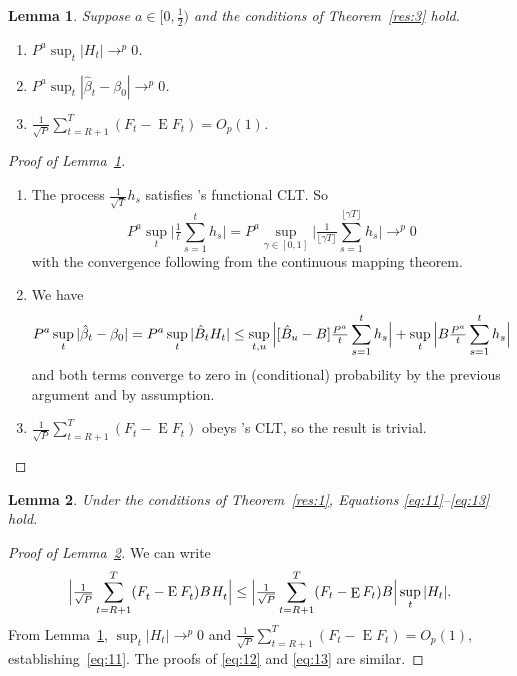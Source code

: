 \documentclass[12pt,fleqn]{article}
\newcommand\citepos[2][]{\citeauthor{#2}'s \citeyearpar[#1]{#2}}
\newtheorem{lema}{Lemma}[section]
\theoremstyle{definition}
\DeclareMathOperator{\E}{E}
\newcommand{\btrue}[1][]{\if#1*\hat\beta_{T+1}\else\beta_0\fi}
\newcommand{\osum}[1]{\sum_{#1=R+1}^T}
\newcommand{\oclt}[1]{\tfrac{1}{\sqrt{P}} \osum{#1}}
\newcommand{\clt}{CLT}
\begin{document}
\begin{lema}\label{res:a2}
  Suppose $a \in [0,\frac12)$ and the conditions of Theorem~\ref{res:3}
  hold.
  \begin{enumerate}
  \item $P^a \sup_t | H_{t} | \to^p 0$.
  \item $P^a \sup_t | \hat{\beta}_{t} - \beta_{0} | \to^{p} 0$.
  \item $\tfrac{1}{\sqrt{P}} \sum_{t=R+1}^T (F_t - \E F_t) = O_{p}(1)$.
  \end{enumerate}
\end{lema}

\begin{proof}[Proof of Lemma~\ref{res:a2}]
  \begin{enumerate}
  \item The process $\tfrac{1}{\sqrt{T}} h_{s}$ satisfies
    \citepos[Theorem 3.1]{JoD:00b} functional \clt.  So
    \begin{equation}
      P^a \sup_t \Big| \tfrac1t \sum_{s=1}^t h_{s} \Big| =
      P^a \sup_{\gamma \in [0,1]} \Big| \tfrac{1}{\lfloor \gamma
        T\rfloor} \sum_{s=1}^{\lfloor \gamma T \rfloor} h_{s} \Big| \to^{p} 0
    \end{equation}
    with the convergence following from the continuous mapping
    theorem.
  \item We have
    \begin{equation}
      P^a \sup_t | \hat{\beta}_t - \btrue | = P^a \sup_t |\hat{B}_{t}
      H_{t}| \leq \sup_{t,u} \Big| [ \hat{B}_u - B]
      \tfrac{P^a}{t} \sum_{s=1}^t h_{s} \Big| + \sup_{t} \Big|
      B \tfrac{P^a}{t} \sum_{s=1}^t h_{s} \Big|
    \end{equation}
    and both terms converge to zero in (conditional) probability by
    the previous argument and by assumption.
  \item $\tfrac{1}{\sqrt{P}} \sum_{t=R+1}^T (F_t - \E F_t)$ obeys
    \citepos{Jon:97} \clt, so the result is trivial.
  \end{enumerate}
\end{proof}

\begin{lema}\label{res:a4}
  Under the conditions of Theorem~\ref{res:1}, Equations
  \eqref{eq:11}--\eqref{eq:13} hold.
\end{lema}

\begin{proof}[Proof of Lemma~\ref{res:a4}]
We can write
\begin{equation*}
  \Big\lvert \WesA \Big\rvert \leq 
  \Big\lvert \oclt{t} (F_t - \E F_t) B \Big\rvert
  \sup_t | H_t |.
\end{equation*}
From Lemma~\ref{res:a2}, $\sup_t | H_t | \to^p 0$ and $\oclt{t}
(F_t - \E F_t) = O_p(1)$, establishing~\eqref{eq:11}. The proofs
of \eqref{eq:12} and \eqref{eq:13} are similar.
\end{proof}


\end{document}
